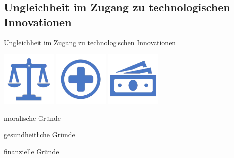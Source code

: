 \documentclass[aspectratio=169,16pt,xcolor=table]{beamer}
\begin{document}
\subsection{Ungleichheit im Zugang zu technologischen Innovationen}
\begin{frame}{Ungleichheit im Zugang zu technologischen Innovationen}
    \centering
    
    \includegraphics[width=0.2\textwidth]{./pictures/Fair.png}
    \hspace{1.8cm}
    \includegraphics[width=0.2\textwidth]{./pictures/+.png}
    \hspace{1.8cm}
    \includegraphics[width=0.2\textwidth]{./pictures/money.png}
    
    \vspace{0.2cm}
    
    \begin{minipage}[t]{0.2\textwidth}
      \centering
      \begin{center}
        \small moralische Gründe
      \end{center}
    \end{minipage}
     \hspace{1.2cm}
    \begin{minipage}[t]{0.2\textwidth}
    \centering
    \small gesundheitliche Gründe
    \end{minipage}
    \hspace{1,8cm}
    \begin{minipage}[t]{0.2\textwidth}
    \centering
    \small finanzielle Gründe
    \end{minipage}
\end{frame}
\end{document}
